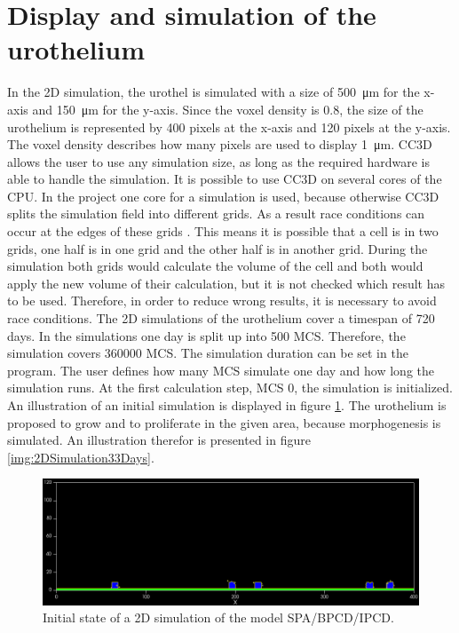 \section{Display and simulation of the urothelium}
In the 2D simulation, the urothel is simulated with a size of \SI{500}{\micro\metre} for the x-axis and \SI{150}{\micro\metre} for the y-axis. Since the voxel density is $0.8$, the size of the urothelium is represented by 400 pixels at the x-axis and 120 pixels at the y-axis. The voxel density describes how many pixels are used to display \SI{1}{\micro\metre}. \ac{CC3D} allows the user to use any simulation size, as long as the required hardware is able to handle the simulation. \newline
It is possible to use \ac{CC3D} on several cores of the CPU. In the project one core for a simulation is used, because otherwise \ac{CC3D} splits the simulation field into different grids. As a result race conditions can occur at the edges of these grids \cite{MaciejH.Swat2017}. This means it is possible that a cell is in two grids, one half is in one grid and the other half is in another grid. During the simulation both grids would calculate the volume of the cell and both would apply the new volume of their calculation, but it is not checked which result has to be used. Therefore, in order to reduce wrong results, it is necessary to avoid race conditions. \newline 
The 2D simulations of the urothelium cover a timespan of 720 days. In the simulations one day is split up into 500 \ac{MCS}. Therefore, the simulation covers 360000 \ac{MCS}. The simulation duration can be set in the program. The user defines how many \ac{MCS} simulate one day and how long the simulation runs. At the first calculation step, \ac{MCS} 0, the simulation is initialized. An illustration of an initial simulation is displayed in figure \ref{img:2DSimulationInitialState}. The urothelium is proposed to grow and to proliferate in the given area, because morphogenesis is simulated. An illustration therefor is presented in figure \ref{img:2DSimulation33Days}.


\begin{figure}[ht]
	\center
	\includegraphics[scale=0.35]{figures/2DSimulation-InitialState.png}
	\caption{Initial state of a 2D simulation of the model SPA/BPCD/IPCD.}
	\label{img:2DSimulationInitialState}
\end{figure}

